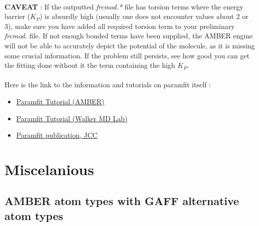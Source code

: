 \documentclass[a4paper]{article}
\begin{document}
\\
\noindent \textbf{CAVEAT} : If the outputted \textit{frcmod.*} file has torsion terms where the energy barrier ($K_P$) is absurdly high (usually one does not encounter values about 2 or 3), make sure you have added all required torsion term to your preliminary \textit{frcmod.} file. If not enough bonded terms have been supplied, the AMBER engine will not be able to accurately depict the potential of the molecule, as it is missing some crucial information. If the problem still persists, see how good you can get the fitting done without it the term containing the high $K_P$.\\
\\
%
%
%
\hspace{-6mm} Here is the link to the information and tutorials on paramfit itself :
\begin{itemize}
    \item \href{https://ambermd.org/tutorials/advanced/tutorial23/index.php}{Paramfit Tutorial (AMBER)}
    \item \href{http://ambermd.org/tutorials/advanced/tutorial23/index.html#Introduction}{Paramfit Tutorial (Walker MD Lab)}
    \item \href{https://pubmed.ncbi.nlm.nih.gov/25413259/}{Paramfit publication, JCC}
\end{itemize}

%
%
%
%
%
%
%
%
%
%
%
%
%
%
%
%
%
%
%
%
%
%
%
%
%
%
%
%
%
%
\pagebreak
\section{Miscelanious}
\subsection{AMBER atom types with GAFF alternative atom types}\label{sec:atomtyping}
\end{document}
